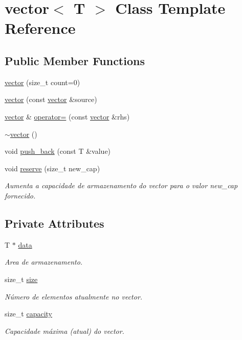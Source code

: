 \hypertarget{classvector}{}\section{vector$<$ T $>$ Class Template Reference}
\label{classvector}
\subsection*{Public Member Functions}
\begin{DoxyCompactItemize}
\item 
\hyperlink{classvector_a3a83d5c85147ccc1a6de86a1204f0e06}{vector} (size\+\_\+t count=0)
\item 
\hyperlink{classvector_aab47f935167e9fca4dc2aec378cee271}{vector} (const \hyperlink{classvector}{vector} \&source)
\item 
\hyperlink{classvector}{vector} \& \hyperlink{classvector_a1a79d01cf69404ebf0e06ea9697790dd}{operator=} (const \hyperlink{classvector}{vector} \&rhs)
\item 
\hyperlink{classvector_a7bc236f547bb5debe890fa8ebaabe965}{$\sim$vector} ()
\item 
void \hyperlink{classvector_ad76deb64969b591fe8accbd2f69ea271}{push\+\_\+back} (const T \&value)
\item 
void \hyperlink{classvector_a187dd0a9042d1e24c08d27d7e1027f06}{reserve} (size\+\_\+t new\+\_\+cap)
\begin{DoxyCompactList}\small\item\em Aumenta a capacidade de armazenamento do vector para o valor {\ttfamily new\+\_\+cap} fornecido. \end{DoxyCompactList}\end{DoxyCompactItemize}
\subsection*{Private Attributes}
\begin{DoxyCompactItemize}
\item 
T $\ast$ \hyperlink{classvector_a7814838e8ff6e26c99a7ae1774fb9188}{data}
\begin{DoxyCompactList}\small\item\em Area de armazenamento. \end{DoxyCompactList}\item 
size\+\_\+t \hyperlink{classvector_aaa851d34f893e80eb4ffc33e93873d02}{size}
\begin{DoxyCompactList}\small\item\em Número de elementos atualmente no vector. \end{DoxyCompactList}\item 
size\+\_\+t \hyperlink{classvector_ac3241a0ca844ecb2a31813543a33e6fb}{capacity}
\begin{DoxyCompactList}\small\item\em Capacidade máxima (atual) do vector. \end{DoxyCompactList}\end{DoxyCompactItemize}
